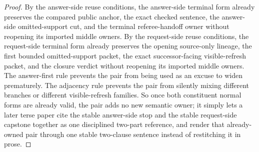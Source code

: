 \documentclass[11pt]{article}
\begin{document}
\begin{proof}
By the answer-side reuse conditions, the answer-side terminal form already preserves the compared public anchor, the exact checked sentence, the answer-side omitted-support cut, and the terminal referee-handoff owner without reopening its imported middle owners.
By the request-side reuse conditions, the request-side terminal form already preserves the opening source-only lineage, the first bounded omitted-support packet, the exact successor-facing visible-refresh packet, and the closure verdict without reopening its imported middle owners.
The answer-first rule prevents the pair from being used as an excuse to widen prematurely.
The adjacency rule prevents the pair from silently mixing different branches or different visible-refresh families.
So once both constituent normal forms are already valid, the pair adds no new semantic owner; it simply lets a later terse paper cite the stable answer-side stop and the stable request-side capstone together as one disciplined two-part reference, and render that already-owned pair through one stable two-clause sentence instead of restitching it in prose.\qedhere
\end{proof}
\end{document}
